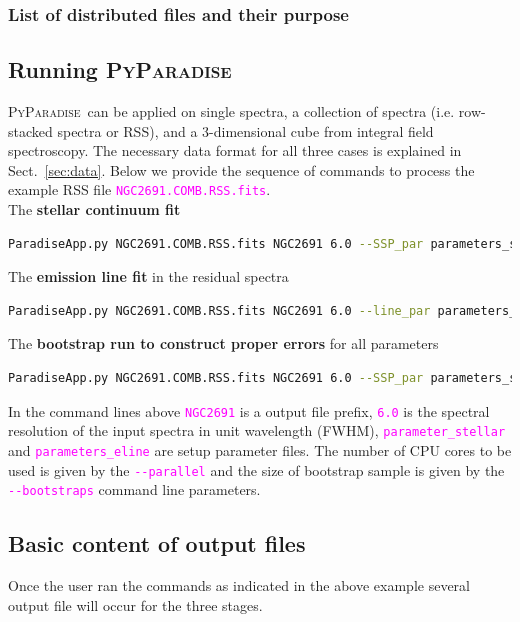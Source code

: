\documentclass[usenatbib,usegraphicx,useAMS,onecolumn]{mn2e}
\newcommand{\codeline}[1]{\lstinline|#1|}
\newcommand{\fname}[1]{\textcolor{magenta}{\codeline{#1}}}
\newcommand{\PyPar}{\mbox{\textsc{PyParadise}}}
\begin{document}
\subsubsection{List of distributed files and their purpose}


\subsection{Running \PyPar}
\PyPar\ can be applied on single spectra, a collection of spectra (i.e. row-stacked spectra or RSS), and a 3-dimensional cube from integral field spectroscopy. The necessary data format for all three cases is explained in Sect.~\ref{sec:data}. Below we provide the sequence of commands to process the example RSS file \fname{NGC2691.COMB.RSS.fits}.\\
The \textbf{stellar continuum fit}
\begin{lstlisting}[language=sh]
    ParadiseApp.py NGC2691.COMB.RSS.fits NGC2691 6.0 --SSP_par parameters_stellar --parallel 1
\end{lstlisting}

\noindent The \textbf{emission line fit} in the residual spectra
\begin{lstlisting}[language=sh]
    ParadiseApp.py NGC2691.COMB.RSS.fits NGC2691 6.0 --line_par parameters_eline --parallel 1
\end{lstlisting}

\noindent The \textbf{bootstrap run to construct proper errors} for all parameters
\begin{lstlisting}[language=sh]
    ParadiseApp.py NGC2691.COMB.RSS.fits NGC2691 6.0 --SSP_par parameters_stellar --line_par parameters_eline --bootstraps 100 --parallel 4
\end{lstlisting}

\noindent In the command lines above \fname{NGC2691} is a output file prefix, \fname{6.0} is the spectral resolution of the input spectra in unit wavelength (FWHM), \fname{parameter_stellar} and \fname{parameters_eline} are setup parameter files. The number of CPU cores to be used is given by the \fname{--parallel}  and the size of bootstrap sample is given by the \fname{--bootstraps} command line parameters.

\subsection{Basic content of output files}
Once the user ran the commands as indicated in the above example several output file will occur for the three stages. 
\end{document}
